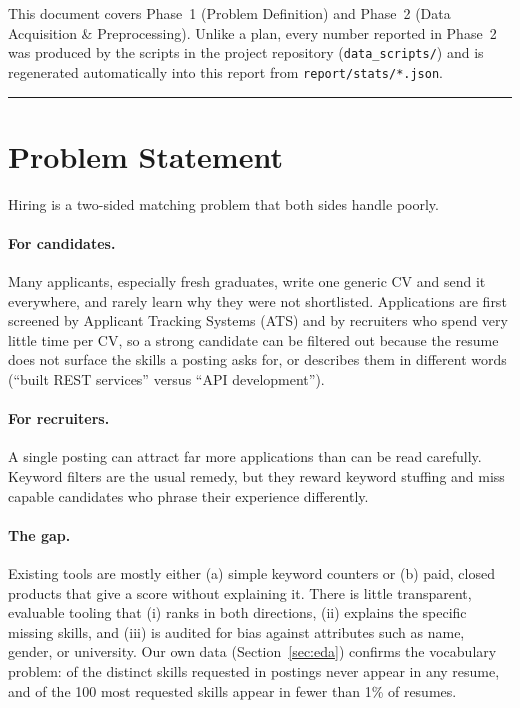 \documentclass[11pt,a4paper]{article}
\newcommand{\phase}[1]{\vspace{0.6em}\noindent{\Large\bfseries\color{rmgrey}#1}\par\vspace{0.2em}\noindent\textcolor{rmgrey}{\rule{\linewidth}{0.6pt}}\par\vspace{0.3em}}
\newcommand{\code}[1]{\texttt{\small #1}}
\begin{document}
This document covers Phase~1 (Problem Definition) and Phase~2 (Data Acquisition \&
Preprocessing). Unlike a plan, every number reported in Phase~2 was produced by the scripts in
the project repository (\code{data\_scripts/}) and is regenerated automatically into this report
from \code{report/stats/*.json}.

\phase{Phase 1: Problem Definition}

\section{Problem Statement}
Hiring is a two-sided matching problem that both sides handle poorly.

\paragraph{For candidates.} Many applicants, especially fresh graduates, write one generic CV
and send it everywhere, and rarely learn why they were not shortlisted. Applications are first
screened by Applicant Tracking Systems (ATS) and by recruiters who spend very little time per
CV, so a strong candidate can be filtered out because the resume does not surface the skills a
posting asks for, or describes them in different words (``built REST services'' versus ``API
development'').

\paragraph{For recruiters.} A single posting can attract far more applications than can be
read carefully. Keyword filters are the usual remedy, but they reward keyword stuffing and miss
capable candidates who phrase their experience differently.

\paragraph{The gap.} Existing tools are mostly either (a) simple keyword counters or (b) paid,
closed products that give a score without explaining it. There is little transparent,
evaluable tooling that (i) ranks in both directions, (ii) explains the specific missing skills,
and (iii) is audited for bias against attributes such as name, gender, or university. Our own
data (Section~\ref{sec:eda}) confirms the vocabulary problem: \SkillsJobOnly of the
\SkillsUniqJobs distinct skills requested in postings never appear in any resume, and
\TopHundredMissing of the 100 most requested skills appear in fewer than 1\% of resumes.
\end{document}
